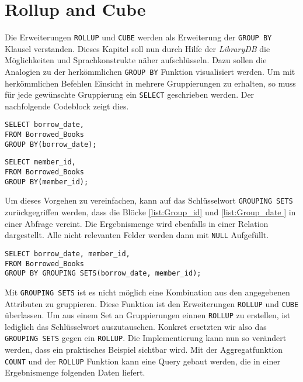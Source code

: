 \section{Rollup and Cube}
\label{sec:rollup_and_cube} Die Erweiterungen \texttt{ROLLUP} und \texttt{CUBE}
werden als Erweiterung der \texttt{GROUP BY} Klausel verstanden. Dieses Kapitel
soll nun durch Hilfe der \textit{LibraryDB} die Möglichkeiten und Sprachkonstrukte
näher aufschlüsseln. Dazu sollen die Analogien zu der herkömmlichen \texttt{GROUP
BY} Funktion visualisiert werden. Um mit herkömmlichen Befehlen Einsicht in
mehrere Gruppierungen zu erhalten, so muss für jede gewünschte Gruppierung ein \texttt{SELECT}
geschrieben werden. Der nachfolgende Codeblock zeigt dies.

\begin{minipage}{0.45\textwidth}
	 \begin{lstlisting}
SELECT borrow_date,
FROM Borrowed_Books
GROUP BY(borrow_date);
	\end{lstlisting}
\end{minipage}
\hfill
\begin{minipage}{0.45\textwidth}
	 \begin{lstlisting}
SELECT member_id,
FROM Borrowed_Books
GROUP BY(member_id);
	\end{lstlisting}
\end{minipage}

Um dieses Vorgehen zu vereinfachen, kann auf das Schlüsselwort \texttt{GROUPING
SETS} zurückgegriffen werden, dass die Blöcke \ref{list:Group_id} und \ref{list:Group_date
} in einer Abfrage vereint. Die Ergebnismenge wird ebenfalls in einer Relation
dargestellt. Alle nicht relevanten Felder werden dann mit \texttt{NULL}
Aufgefüllt.

\begin{lstlisting}
SELECT borrow_date, member_id,
FROM Borrowed_Books
GROUP BY GROUPING SETS(borrow_date, member_id);
\end{lstlisting}

Mit \texttt{GROUPING SETS} ist es nicht möglich eine Kombination aus den
angegebenen Attributen zu gruppieren. Diese Funktion ist den Erweiterungen \texttt{ROLLUP}
und \texttt{CUBE} überlassen. Um aus einem Set an Gruppierungen einnen \texttt{ROLLUP}
zu erstellen, ist lediglich das Schlüsselwort auszutauschen. Konkret ersetzten wir
also das \texttt{GROUPING SETS} gegen ein \texttt{ROLLUP}. Die Implementierung
kann nun so verändert werden, dass ein praktisches Beispiel sichtbar wird. Mit
der Aggregatfunktion \texttt{COUNT} und der \texttt{ROLLUP} Funktion kann eine
Query gebaut werden, die in einer Ergebnismenge folgenden Daten liefert.

